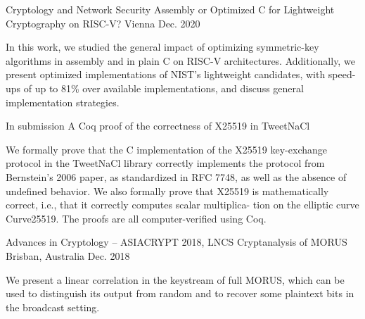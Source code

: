{}


\begin{cventries}
    \cventry
      {Cryptology and Network Security}
      {Assembly or Optimized C for Lightweight Cryptography on RISC-V?} %
      {Vienna} %
      {Dec. 2020} %
      {
        \begin{cvitems} %
          \item {In this work, we studied the general impact of optimizing symmetric-key algorithms in assembly and in plain C on RISC-V architectures. Additionally, we present optimized implementations of NIST's lightweight candidates, with speed-ups of up to 81\% over available implementations, and discuss general implementation strategies.}
        \end{cvitems}
      }
    \cventry
      {In submission}
      {A Coq proof of the correctness of X25519 in TweetNaCl} %
      {} %
      {} %
      {
        \begin{cvitems} %
          \item {We formally prove that the C implementation of the X25519
key-exchange protocol in the TweetNaCl library correctly implements the protocol from Bernstein’s 2006 paper, as standardized in RFC 7748, as well
as the absence of undefined behavior. We also formally prove that X25519 is mathematically correct, i.e., that it correctly computes scalar multiplica-
tion on the elliptic curve Curve25519. The proofs are all computer-verified using Coq.}
        \end{cvitems}
      }

    \cventry
      {Advances in Cryptology – ASIACRYPT 2018, LNCS}
      {Cryptanalysis of MORUS} %
      {Brisban, Australia} %
      {Dec. 2018} %
      {
        \begin{cvitems} %
          \item {We present a linear correlation in the keystream of full MORUS, which can be used to distinguish its output from random and to recover some plaintext bits in the broadcast setting.}
        \end{cvitems}
      }


\end{cventries}

